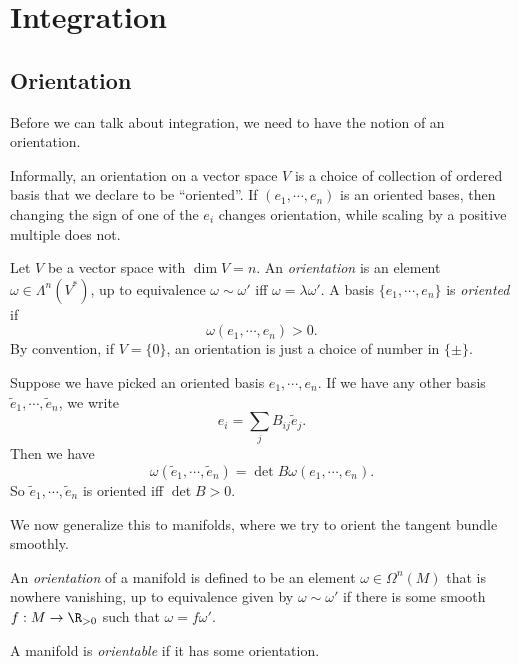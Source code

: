\documentclass[a4paper]{article}
\begin{document}
\section{Integration}
\subsection{Orientation}
Before we can talk about integration, we need to have the notion of an orientation.

Informally, an orientation on a vector space $V$ is a choice of collection of ordered basis that we declare to be ``oriented''. If $(e_1, \cdots, e_n)$ is an oriented bases, then changing the sign of one of the $e_i$ changes orientation, while scaling by a positive multiple does not.
\begin{defi}
  Let $V$ be a vector space with $\dim V = n$. An \emph{orientation} is an element $\omega \in\Lambda^n (V^*)$, up to equivalence $\omega \sim \omega'$ iff $\omega = \lambda \omega'$. A basis $\{e_1, \cdots, e_n\}$ is \emph{oriented} if
  \[
    \omega(e_1, \cdots, e_n) > 0.
  \]
  By convention, if $V = \{0\}$, an orientation is just a choice of number in $\{\pm\}$.
\end{defi}

Suppose we have picked an oriented basis $e_1, \cdots, e_n$. If we have any other basis $\tilde{e}_1, \cdots, \tilde{e}_n$, we write
\[
  e_i = \sum_j B_{ij} \tilde{e}_j.
\]
Then we have
\[
  \omega (\tilde{e}_1, \cdots, \tilde{e}_n) = \det B \omega(e_1, \cdots, e_n).
\]
So $\tilde{e}_1, \cdots, \tilde{e}_n$ is oriented iff $\det B > 0$.

We now generalize this to manifolds, where we try to orient the tangent bundle smoothly.

\begin{defi}
  An \emph{orientation} of a manifold is defined to be an element $\omega \in \Omega^n(M)$ that is nowhere vanishing, up to equivalence given by $ \omega \sim \omega'$ if there is some smooth $f: M \to \R_{> 0}$ such that $\omega = f \omega'$.
\end{defi}

\begin{defi}
  A manifold is \emph{orientable} if it has some orientation.
\end{defi}
\end{document}
